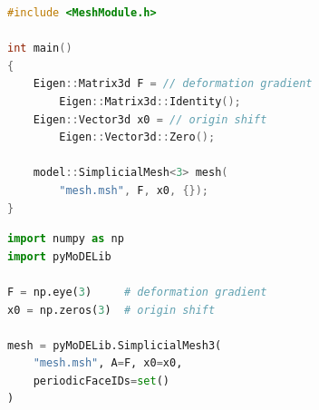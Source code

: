 \noindent\begin{minipage}{\linewidth}
\begin{minipage}[t]{0.48\linewidth}
\begin{tcolorbox}[enhanced,colback=manualblue!5,colframe=manualblue!35,boxrule=0.4pt,
 arc=1mm,left=2mm,right=2mm,top=7mm,bottom=2mm,height=5cm,
 overlay={\node[anchor=north east,inner sep=1mm] at (frame.north east) {\cppsymbol};}]
\begin{lstlisting}[language=C++,basicstyle=\footnotesize\ttfamily,frame=none,backgroundcolor=\color{manualblue!5},aboveskip=0pt,belowskip=0pt]
#include <MeshModule.h>

int main()
{
    Eigen::Matrix3d F = // deformation gradient
        Eigen::Matrix3d::Identity();
    Eigen::Vector3d x0 = // origin shift
        Eigen::Vector3d::Zero();

    model::SimplicialMesh<3> mesh(
        "mesh.msh", F, x0, {});
}
\end{lstlisting}
\end{tcolorbox}
\end{minipage}\hfill
\begin{minipage}[t]{0.48\linewidth}
\begin{tcolorbox}[enhanced,colback=Goldenrod!9,colframe=Goldenrod!55!black,boxrule=0.4pt,
 arc=1mm,left=2mm,right=2mm,top=7mm,bottom=2mm,height=5cm,
 overlay={\node[anchor=north east,inner sep=2mm] at (frame.north east) {\pythonsymbol};}]
\begin{lstlisting}[language=Python,basicstyle=\footnotesize\ttfamily,frame=none,backgroundcolor=\color{Goldenrod!9},aboveskip=0pt,belowskip=0pt]
import numpy as np
import pyMoDELib

F = np.eye(3)     # deformation gradient
x0 = np.zeros(3)  # origin shift

mesh = pyMoDELib.SimplicialMesh3(
    "mesh.msh", A=F, x0=x0,
    periodicFaceIDs=set()
)
\end{lstlisting}
\end{tcolorbox}
\end{minipage}
\captionsetup{hypcap=false}
\end{minipage}


